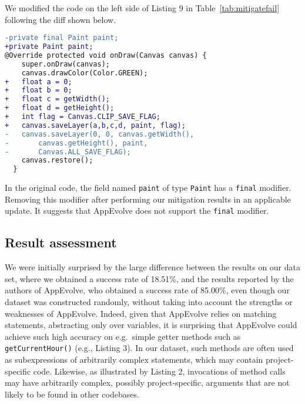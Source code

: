 We modified the code on the left side of Listing 9 in
Table~\ref{tab:mitigatefail} following the diff shown below.


\begin{lstlisting}[language=diff,numbers=none]
-private final Paint paint;
+private Paint paint;
@Override protected void onDraw(Canvas canvas) {
    super.onDraw(canvas);
    canvas.drawColor(Color.GREEN);
+   float a = 0;
+   float b = 0;
+   float c = getWidth();
+   float d = getHeight();
+   int flag = Canvas.CLIP_SAVE_FLAG;
+   canvas.saveLayer(a,b,c,d, paint, flag);
-   canvas.saveLayer(0, 0, canvas.getWidth(),
-       canvas.getHeight(), paint,
-       Canvas.ALL_SAVE_FLAG);
    canvas.restore();
  }
\end{lstlisting}

\vspace{\baselineskip}

In the original code, the field named {\tt paint} of type {\tt Paint} has a
{\tt final} modifier. Removing this modifier after performing our
mitigation results in an applicable update. It suggests that AppEvolve does
not support the {\tt final} modifier.

\subsection{Result assessment}

We were initially surprised by the large difference between the results on
our data set, where we obtained a success rate of 18.51\%, and the results
reported by the authors of AppEvolve, who obtained a success rate of
85.00\%, even though our dataset was constructed randomly, without taking
into account the strengths or weaknesses of AppEvolve.  Indeed, given that
AppEvolve relies on matching statements, abstracting only over variables,
it is surprising that AppEvolve could achieve such high accuracy on
e.g.\ simple getter methods such as {\tt getCurrentHour()} (e.g., Listing
3). In our dataset, such methods are often used as subexpressions of
arbitrarily complex statements, which may contain project-specific code.
Likewise, as illustrated by Listing 2, invocations of method calls may have
arbitrarily complex, possibly project-specific, arguments that are not
likely to be found in other codebases.

